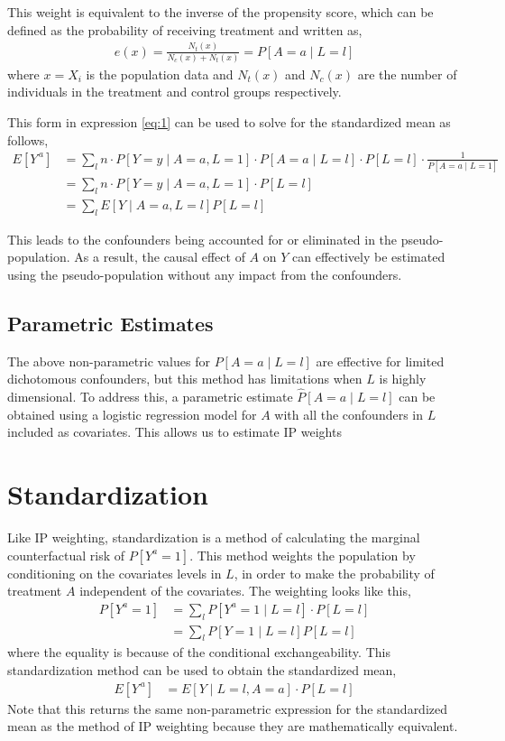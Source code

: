 This weight is equivalent to the inverse of the propensity score, which can be defined as the probability of receiving treatment and written as,\cite{imbens2015causal}
\begin{align} 
e(x) = \frac{N_t(x)}{N_c(x) + N_t(x)} = P[A=a \mid L = l] 
\end{align} 
where $x = X_i$ is the population data and $N_t(x)$ and $N_c (x)$ are the number of individuals in the treatment and control groups respectively.  

This form in expression \ref{eq:1} can be used to solve for the standardized mean as follows, 
\begin{align} 
E[Y^{\,a}] &= \sum_l n \cdot P[Y=y \mid A = a, L= 1] \cdot P[A=a \mid L=l]  \cdot P[L=l] \cdot \frac{1}{P[A = a \mid L = 1]} \\ 
&=  \sum_l n \cdot P[Y=y \mid A = a, L= 1] \cdot P[L=l]\\ 
&= \sum_l E[Y \mid A=a, L= l] P[L=l] 
\end{align} 

This leads to the confounders being accounted for or eliminated in the pseudo-population.  As a result, the causal effect of $A$ on $Y$ can effectively be estimated using the pseudo-population without any impact from the confounders.  

\subsection{Parametric Estimates} 
The above non-parametric values for $P[A=a\mid L=l]$ are effective for limited dichotomous confounders, but this method has limitations when $L$ is highly dimensional.  To address this, a parametric estimate $\widehat{P}[A=a\mid L=l]$ can be obtained using a logistic regression model for $A$ with all the confounders in $L$ included as covariates.  This allows us to estimate IP weights 

\section{Standardization} \label{Standardization} 
Like IP weighting, standardization is a method of calculating the marginal counterfactual risk of $P[Y^a = 1]$.  This method weights the population by  conditioning on the covariates levels in $L$, in order to make the probability of treatment $A$ independent of the covariates.  The weighting looks like this, 
\begin{align} 
P[Y^a = 1] &= \sum_l P[Y^a = 1 \mid L=l] \cdot P[L = l] \\ 
&= \sum_l P[Y = 1 \mid L=l] P[L = l]  
\end{align} 
where the equality is because of the conditional exchangeability.  This standardization method can be used to obtain the standardized mean, 
\begin{align} 
E[Y^{\,a}] &= E[Y \mid L = l, A =a ] \cdot P[L=l] 
\end{align} 
Note that this returns the same non-parametric expression for the standardized mean as the method of IP weighting because they are mathematically equivalent.  
